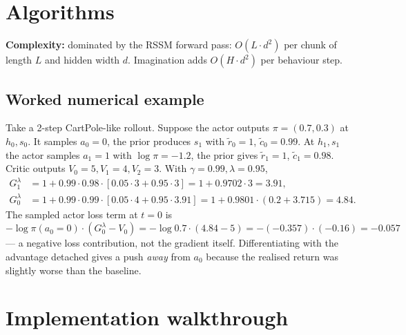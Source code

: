 \documentclass[11pt,oneside]{scrbook}
\begin{document}
\chapter{Algorithms}

\begin{algorithm}[H]
\caption{Dreamer-lite}
\end{algorithm}

\textbf{Complexity:} dominated by the RSSM forward pass: $O(L \cdot d^2)$ per chunk of length
$L$ and hidden width $d$. Imagination adds $O(H \cdot d^2)$ per behaviour step.

\section{Worked numerical example}

Take a 2-step CartPole-like rollout. Suppose the actor outputs $\pi = (0.7, 0.3)$ at
$h_0, s_0$. It samples $a_0 = 0$, the prior produces $s_1$ with $\tilde r_0 = 1$, $\tilde c_0 = 0.99$.
At $h_1, s_1$ the actor samples $a_1 = 1$ with $\log \pi = -1.2$, the prior gives
$\tilde r_1 = 1$, $\tilde c_1 = 0.98$. Critic outputs $V_0 = 5, V_1 = 4, V_2 = 3$. With
$\gamma = 0.99, \lambda = 0.95$,
\begin{align*}
G_1^\lambda &= 1 + 0.99 \cdot 0.98 \cdot [0.05 \cdot 3 + 0.95 \cdot 3] = 1 + 0.9702 \cdot 3 = 3.91, \\
G_0^\lambda &= 1 + 0.99 \cdot 0.99 \cdot [0.05 \cdot 4 + 0.95 \cdot 3.91] = 1 + 0.9801 \cdot (0.2 + 3.715) = 4.84.
\end{align*}
The sampled actor loss term at $t=0$ is $-\log \pi(a_0=0) \cdot (G_0^\lambda - V_0) = -\log 0.7 \cdot (4.84 - 5) = -(-0.357) \cdot (-0.16) = -0.057$ --- a negative loss contribution, not the gradient itself. Differentiating with the advantage detached gives a push \emph{away} from $a_0$ because the realised return was slightly worse than the baseline.

\chapter{Implementation walkthrough}
\end{document}
